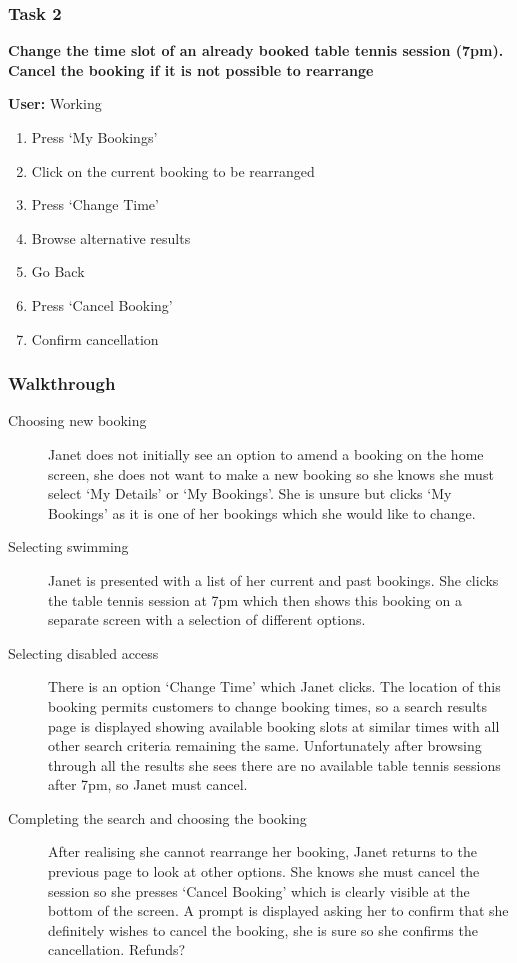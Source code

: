 \subsubsection{Task 2}
\label{ssub:task_2}

\textbf{Change the time slot of an already booked table tennis session (7pm).
Cancel the booking if it is not possible to rearrange}

\textbf{User:} Working
\begin{enumerate}
	\item Press `My Bookings'
	\item Click on the current booking to be rearranged
	\item Press `Change Time'
	\item Browse alternative results
	\item Go Back
	\item Press `Cancel Booking'
	\item Confirm cancellation
\end{enumerate}

\subsubsection{Walkthrough}

\begin{description}
	\item[Choosing new booking] Janet does not initially see an option to amend
		a booking on the home screen, she does not want to make a new booking
		so she knows she must select `My Details' or `My Bookings'. She is
		unsure but clicks `My Bookings' as it is one of her bookings which she
		would like to change.

	\item[Selecting swimming] Janet is presented with a list of her current and
		past bookings. She clicks the table tennis session at 7pm which then
		shows this booking on a separate screen with a selection of different
		options.

	\item[Selecting disabled access] There is an option `Change Time' which
		Janet clicks. The location of this booking permits customers to change
		booking times, so a search results page is displayed showing available
		booking slots at similar times with all other search criteria remaining
		the same. Unfortunately after browsing through all the results she sees
		there are no available table tennis sessions after 7pm, so Janet must
		cancel.

	\item[Completing the search and choosing the booking] After realising she
		cannot rearrange her booking, Janet returns to the previous page to
		look at other options. She knows she must cancel the session so she
		presses `Cancel Booking' which is clearly visible at the bottom of the
		screen. A prompt is displayed asking her to confirm that she definitely
		wishes to cancel the booking, she is sure so she confirms the
		cancellation. Refunds?
\end{description}


